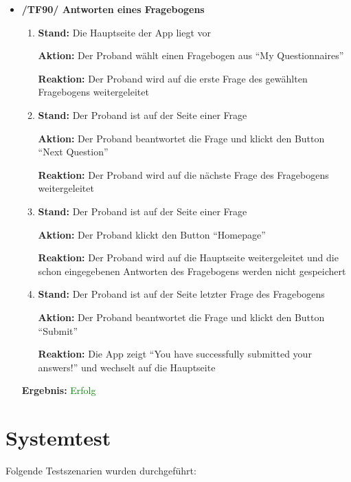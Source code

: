 \documentclass[a4paper]{scrreprt}
\begin{document}
\begin{itemize}
	        \item \textbf{/TF90/ Antworten eines Fragebogens}
	        \begin{enumerate}
	        	\item \par \textbf{Stand: }Die Hauptseite der App liegt vor
	        	\par \textbf{Aktion: }Der Proband wählt einen Fragebogen aus ``My Questionnaires''
	        	\par \textbf{Reaktion: }Der Proband wird auf die erste Frage des gewählten Fragebogens weitergeleitet
	        	\item \par \textbf{Stand: }Der Proband ist auf der Seite einer Frage
	        	\par \textbf{Aktion: }Der Proband beantwortet die Frage und klickt den Button ``Next Question''
	        	\par \textbf{Reaktion: }Der Proband wird auf die nächste Frage des Fragebogens weitergeleitet
	        	\item \par \textbf{Stand: }Der Proband ist auf der Seite einer Frage
	        	\par \textbf{Aktion: }Der Proband klickt den Button ``Homepage''
	        	\par \textbf{Reaktion: }Der Proband wird auf die Hauptseite weitergeleitet und die schon eingegebenen Antworten des Fragebogens werden nicht gespeichert
	        	\item \par \textbf{Stand: }Der Proband ist auf der Seite letzter Frage des Fragebogens
	        	\par \textbf{Aktion: }Der Proband beantwortet die Frage und klickt den Button ``Submit''
	        	\par \textbf{Reaktion: }Die App zeigt ``You have successfully submitted your answers!'' und wechselt auf die Hauptseite
	        \end{enumerate}
					\vspace*{0.3cm}
		           \par \textbf{Ergebnis: }\textcolor{green}{Erfolg}
		           \vspace*{0.6cm} 	

            \end{itemize}	
	
	
	  \newpage
	  \chapter{Systemtest}
	  Folgende Testszenarien wurden durchgef\"uhrt:
	
\end{document}
